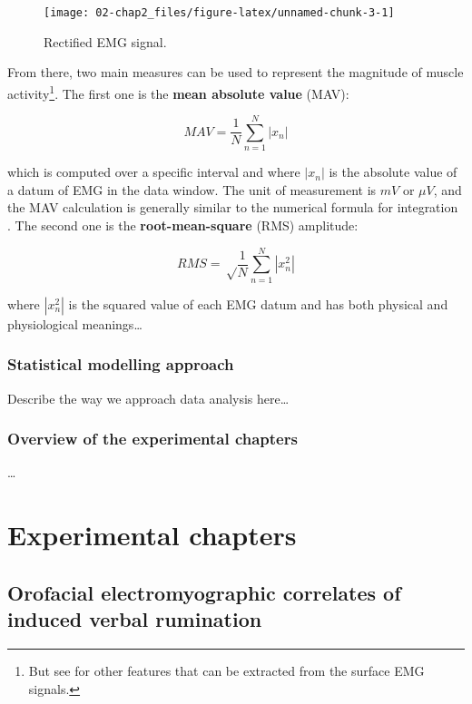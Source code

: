 \documentclass[a4paper,12pt,oneside,oldfontcommands]{memoir}
\let\rmarkdownfootnote\footnote%
\def\footnote{\protect\rmarkdownfootnote}
\begin{document}
\begin{figure}[H]

{\centering \texttt{[image: 02-chap2\_files/figure-latex/unnamed-chunk-3-1]} 

}

\caption{Rectified EMG signal.}\label{fig:unnamed-chunk-3}
\end{figure}

From there, two main measures can be used to represent the magnitude of
muscle activity\footnote{But see \citet{phinyomark_feature_2012} for
  other features that can be extracted from the surface EMG signals.}.
The first one is the \textbf{mean absolute value} (MAV):

\[MAV = \frac{1}{N} \sum_{n=1}^{N} | x_{n} |\]

which is computed over a specific interval and where \(|x_{n}|\) is the
absolute value of a datum of EMG in the data window. The unit of
measurement is \(mV\) or \(\mu V\), and the MAV calculation is generally
similar to the numerical formula for integration
\citep{kamen_essentials_2010}. The second one is the
\textbf{root-mean-square} (RMS) amplitude:

\[RMS = \sqrt \frac{1}{N} \sum_{n=1}^{N} | x^{2}_{n} |\]

where \(| x^{2}_{n} |\) is the squared value of each EMG datum and has
both physical and physiological meanings\ldots{}

\section{Statistical modelling
approach}\label{statistical-modelling-approach}

Describe the way we approach data analysis here\ldots{}

\section{Overview of the experimental
chapters}\label{overview-of-the-experimental-chapters}

\ldots{}

\part{Experimental
chapters}\label{part-experimental-chapters}

\chapter{Orofacial electromyographic correlates of induced verbal
rumination}\label{orofacial-electromyographic-correlates-of-induced-verbal-rumination}
\end{document}
